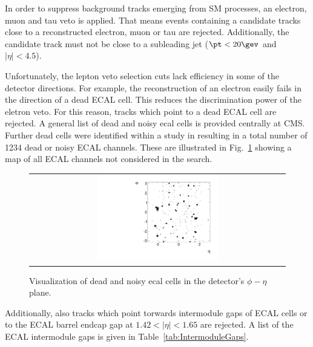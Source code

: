 In order to suppress background tracks emerging from SM processes, an electron, muon and tau veto is applied.
That means events containing a candidate tracks close to a reconstructed electron, muon or tau are rejected.
Additionally, the candidate track must not be close to a subleading jet ($\pt<20\gev$ and $|\eta|<4.5$).

Unfortunately, the lepton veto selection cuts lack efficiency in some of the detector directions.
For example, the reconstruction of an electron easily fails in the direction of a dead ECAL cell.
This reduces the discrimination power of the eletron veto.
For this reason, tracks which point to a dead ECAL cell are rejected.
A general list of dead and noisy ecal cells is provided centrally at CMS.
Further dead cells were identified within a study in \cite{bib:CMS:DT_8TeV} resulting in a total number of 1234 dead or noisy ECAL channels. 
These are illustrated in Fig.~\ref{fig:DeadECALmap} showing a map of all ECAL channels not considered in the search.
\begin{figure}[!t]
  \centering 
  \begin{tabular}{c}
    \includegraphics[width=0.49\textwidth]{figures/analysis/DeadECALMap.pdf}
  \end{tabular}
  \caption{Visualization of dead and noisy ecal cells in the detector's $\phi - \eta$ plane.}
  \label{fig:DeadECALmap}
\end{figure}

Additionally, also tracks which point torwards intermodule gaps of ECAL cells or to the ECAL barrel endcap gap at $1.42<|\eta|<1.65$ are rejected.
A list of the ECAL intermodule gaps is given in Table~\ref{tab:IntermoduleGaps}.
\renewcommand{\arraystretch}{1.5}
\begin{table}[!hbt]
\centering
\caption{Intermodule ECAL gaps.}
\label{tab:IntermoduleGaps}
\end{table}  

